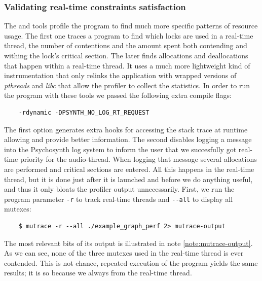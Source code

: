 \subsubsection{Validating real-time constraints satisfaction}

The  and 
tools profile the program to find much more specific patterns of
resource usage. The first one traces a program to find which locks are
used in a real-time thread, the number of contentions and the amount
spent both contending and withing the lock's critical section. The
later finds allocations and deallocations that happen within a
real-time thread. It uses a much more lightweight kind of
instrumentation that only relinks the application with wrapped
versions of \emph{pthreads} and \emph{libc} that allow the profiler to
collect the statistics. In order to run the program with these tools
we passed the following extra compile flags:
\begin{verbatim}
    -rdynamic -DPSYNTH_NO_LOG_RT_REQUEST
\end{verbatim}

The first option generates extra hooks for accessing the stack trace
at runtime allowing  and  provide better
information. The second disables logging a message into the
Psychosynth log system to inform the user that we succesfully got
real-time priority for the audio-thread. When logging that message
several allocations are performed and critical sections are
entered. All this happens in the real-time thread, but it is done just
after it is launched and before we do anything useful, and thus it
only bloats the profiler output unnecessarily. First, we run the
program parameter \verb|-r| to track real-time threads and
\verb|--all| to display all mutexes:
\begin{verbatim}
    $ mutrace -r --all ./example_graph_perf 2> mutrace-output
\end{verbatim}

The most relevant bits of its output is illustrated in note
\ref{note:mutrace-output}. As we can see, none of the three mutexes
used in the real-time thread is ever contended. This is not chance,
repeated execution of the program yields the same results; it is so
because we always  from the real-time thread.

